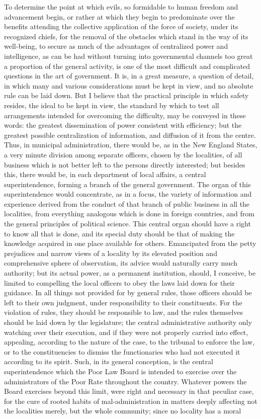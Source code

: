 \documentclass[12pt]{report}
\begin{document}
To determine the point at which evils, so formidable to human freedom and advancement begin, or rather at which they begin to predominate over the benefits attending the collective application of the force of society, under its recognized chiefs, for the removal of the obstacles which stand in the way of its well-being, to secure as much of the advantages of centralized power and intelligence, as can be had without turning into governmental channels too great a proportion of the general activity, is one of the most difficult and complicated questions in the art of government. It is, in a great measure, a question of detail, in which many and various considerations must be kept in view, and no absolute rule can be laid down. But I believe that the practical principle in which safety resides, the ideal to be kept in view, the standard by which to test all arrangements intended for overcoming the difficulty, may be conveyed in these words: the greatest dissemination of power consistent with efficiency; but the greatest possible centralization of information, and diffusion of it from the centre. Thus, in municipal administration, there would be, as in the New England States, a very minute division among separate officers, chosen by the localities, of all business which is not better left to the persons directly interested; but besides this, there would be, in each department of local affairs, a central superintendence, forming a branch of the general government. The organ of this superintendence would concentrate, as in a focus, the variety of information and experience derived from the conduct of that branch of public business in all the localities, from everything analogous which is done in foreign countries, and from the general principles of political science. This central organ should have a right to know all that is done, and its special duty should be that of making the knowledge acquired in one place available for others. Emancipated from the petty prejudices and narrow views of a locality by its elevated position and comprehensive sphere of observation, its advice would naturally carry much authority; but its actual power, as a permanent institution, should, I conceive, be limited to compelling the local officers to obey the laws laid down for their guidance. In all things not provided for by general rules, those officers should be left to their own judgment, under responsibility to their constituents. For the violation of rules, they should be responsible to law, and the rules themselves should be laid down by the legislature; the central administrative authority only watching over their execution, and if they were not properly carried into effect, appealing, according to the nature of the case, to the tribunal to enforce the law, or to the constituencies to dismiss the functionaries who had not executed it according to its spirit. Such, in its general conception, is the central superintendence which the Poor Law Board is intended to exercise over the administrators of the Poor Rate throughout the country. Whatever powers the Board exercises beyond this limit, were right and necessary in that peculiar case, for the cure of rooted habits of mal-administration in matters deeply affecting not the localities merely, but the whole community; since no locality has a moral 
\end{document}

